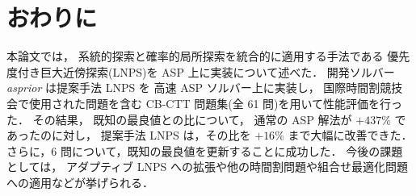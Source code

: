 \chapter{おわりに}

本論文では，
系統的探索と確率的局所探索を統合的に適用する手法である
優先度付き巨大近傍探索(LNPS)を ASP 上に実装について述べた．
開発ソルバー \textit{asprior} は提案手法 LNPS を
高速 ASP ソルバー{\clingo}上に実装し，
国際時間割競技会で使用された問題を含む
 CB-CTT 問題集(全 61 問)を用いて性能評価を行った．
その結果，
既知の最良値との比について，
通常の ASP 解法が $+437\%$ であったのに対し，
提案手法 LNPS は，その比を $+16\%$ まで大幅に改善できた．
さらに，6 問について，既知の最良値を更新することに成功した．
今後の課題としては，
アダプティブ LNPS への拡張や他の時間割問題や組合せ最適化問題への適用などが挙げられる．


